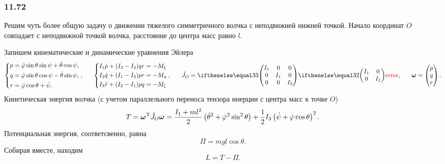 \subsubsection*{11.72}

Решим чуть более общую задачу о движении тяжелого симметричного волчка с неподвижней нижней точкой. Начало координат $O$ совпадает с неподвижной точкой волчка, расстояние до центра масс равно $l$. 

Запишем кинематические и динамические уравнения Эйлера
\begin{equation*}
    \left\{\begin{aligned}
        p &= \dot{\varphi} \sin \theta \sin \psi + \dot{\theta} \cos \psi,\\
        q &= \dot{\varphi} \sin \theta \cos \psi - \dot{\theta} \sin \psi,\\
        r &= \dot{\varphi} \cos \theta + \dot{\psi}.
    \end{aligned}\right.,
    \hspace{0.6cm} 
    \left\{\begin{aligned}
        I_1 \dot{p} + (I_3-I_2) q r &= - M_{\xi} \\
        I_2 \dot{q} + (I_1-I_3) p r &= - M_{\eta} \\
        I_3 \dot{r} + (I_2-I_1) p q &= - M_{\zeta} \\
    \end{aligned}\right.,   
    \hspace{0.6cm} 
    \hat{J}_O = \dmat{3}{I_1}{I_1}{I_3}, \hspace{0.6cm} 
    \vc{\omega} = \begin{pmatrix}
        p \\ q \\ r
    \end{pmatrix}.
\end{equation*}
Кинетическая энергия волчка (с учетом параллельного переноса тензора инерции с центра масс к точке $O$)
\begin{equation*}
    T = \mbox{\boldmath $\omega$}^{\text{T}} \hat{J}_O \mbox{\boldmath $\omega$} = 
    \frac{I_1+ml^2}{2} \left(\dot{\theta}^2+\dot{\varphi}^2\sin^2 \theta\right) + \frac{1}{2} I_3 \left(\dot{\psi}+ \dot{\varphi} \cos \theta \right)^2.
\end{equation*}
Потенциальная энергия, соответсвенно, равна
\begin{equation*}
    \Pi = mgl \cos \theta.
\end{equation*}
Собирая вместе, находим
\begin{equation*}
    L = T - \Pi.
\end{equation*}

